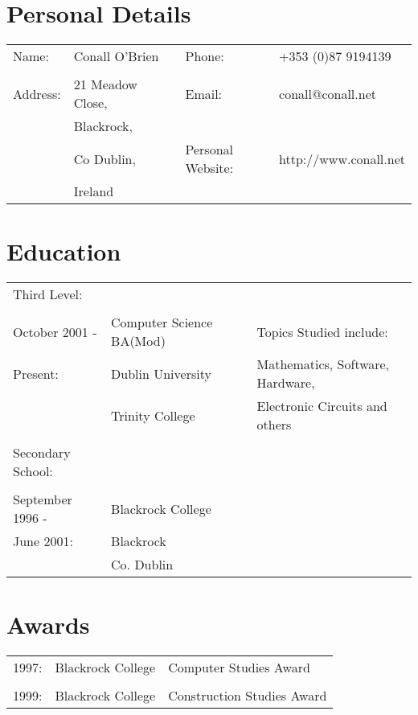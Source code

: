 \documentclass[a4paper, 11pt] {article}
\begin{document}
\section*{Personal Details}

\begin{tabular}{l l l l l}
Name: 	& Conall O'Brien		&	&	Phone:		 		& +353 (0)87 9194139	  	\\
			&	 						&	&							&	 						  	\\
Address:	& 21 Meadow Close, 	&	&	Email: 				& conall@conall.net 	  	\\	
			& Blackrock,			&	&							&	 		              	\\
			& Co Dublin, 		 	&	&	Personal Website:	& http://www.conall.net	\\
			& Ireland				&	&							&								\\
\end{tabular}

\section*{Education}

\begin{tabular}{l l l l}
Third Level:			&									&	&												\\
							&									&	&												\\
October 2001 - 		& Computer Science BA(Mod)	&	&	Topics Studied include:				\\
Present:					& 	Dublin University 		&	&	Mathematics, Software, Hardware,	\\
							& 	Trinity College 			&	& 	Electronic Circuits and others	\\
							&									&	&	\\
Secondary School: 	&									&	&	\\	
							&									&	&	\\
September 1996 - 		& Blackrock College			&	&	\\
June 2001:				& Blackrock						&	&	\\
							& Co. Dublin 					&	&	\\
\end{tabular}

\section*{Awards}

\begin{tabular}{l l l}
1997:	& Blackrock College	 & 	Computer Studies Award 		\\
		& 							 & 										\\
1999:	& Blackrock College 	 & 	Construction Studies Award	\\
\end{tabular}
\end{document}
